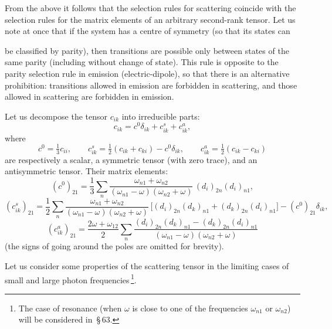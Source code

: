 From the above it follows that the selection rules for scattering coincide with the selection rules for the matrix elements of an arbitrary second-rank tensor. Let us note at once that if the system has a centre of symmetry (so that its states can

be classified by parity), then transitions are possible only between states of the same parity (including without change of state). This rule is opposite to the parity selection rule in emission (electric-dipole), so that there is an alternative prohibition: transitions allowed in emission are forbidden in scattering, and those allowed in scattering are forbidden in emission.

Let us decompose the tensor $c_{ik}$ into irreducible parts:
\begin{equation}
c_{ik} = c^0\delta_{ik} + c^s_{ik} + c^a_{ik},
\tag{59.9}
\end{equation}
where
\begin{equation}
c^0 = \tfrac{1}{3}c_{ii},\qquad c^s_{ik} = \tfrac{1}{2}(c_{ik} + c_{ki}) - c^0\delta_{ik},\qquad c^a_{ik} = \tfrac{1}{2}(c_{ik} - c_{ki})
\tag{59.10}
\end{equation}
are respectively a scalar, a symmetric tensor (with zero trace), and an antisymmetric tensor. Their matrix elements:
\begin{equation}
(c^0)_{21} = \frac{1}{3}\sum_n\frac{\omega_{n1} + \omega_{n2}}{(\omega_{n1} - \omega)(\omega_{n2} + \omega)}\,(d_i)_{2n}(d_i)_{n1},
\tag{59.11}
\end{equation}
\begin{equation}
(c^s_{ik})_{21} = \frac{1}{2}\sum_n\frac{\omega_{n1} + \omega_{n2}}{(\omega_{n1} - \omega)(\omega_{n2} + \omega)}\,\bigl[(d_i)_{2n}(d_k)_{n1} + (d_k)_{2n}(d_i)_{n1}\bigr] - (c^0)_{21}\delta_{ik},
\tag{59.12}
\end{equation}
\begin{equation}
(c^a_{ik})_{21} = \frac{2\omega + \omega_{12}}{2}\sum_n\frac{(d_i)_{2n}(d_k)_{n1} - (d_k)_{2n}(d_i)_{n1}}{(\omega_{n1} - \omega)(\omega_{n2} + \omega)}
\tag{59.13}
\end{equation}
(the signs of going around the poles are omitted for brevity).

Let us consider some properties of the scattering tensor in the limiting cases of small and large photon frequencies\,\footnote{The case of resonance (when $\omega$ is close to one of the frequencies $\omega_{n1}$ or $\omega_{n2}$) will be considered in~\S\,63.}.

